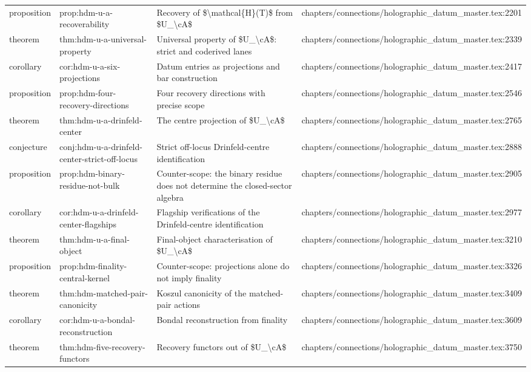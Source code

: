 \documentclass[11pt]{article}
\begin{document}
\begin{longtable}{L{0.10\textwidth}L{0.26\textwidth}L{0.42\textwidth}L{0.22\textwidth}}
proposition & prop:hdm-u-a-recoverability & Recovery of \$\textbackslash{}mathcal\{H\}(T)\$ from \$U\_\textbackslash{}cA\$ & chapters/connections/holographic\_datum\_master.tex:2201\\
theorem & thm:hdm-u-a-universal-property & Universal property of \$U\_\textbackslash{}cA\$: strict and coderived lanes & chapters/connections/holographic\_datum\_master.tex:2339\\
corollary & cor:hdm-u-a-six-projections & Datum entries as projections and bar construction & chapters/connections/holographic\_datum\_master.tex:2417\\
proposition & prop:hdm-four-recovery-directions & Four recovery directions with precise scope & chapters/connections/holographic\_datum\_master.tex:2546\\
theorem & thm:hdm-u-a-drinfeld-center & The centre projection of \$U\_\textbackslash{}cA\$ & chapters/connections/holographic\_datum\_master.tex:2765\\
conjecture & conj:hdm-u-a-drinfeld-center-strict-off-locus & Strict off-locus Drinfeld-centre identification & chapters/connections/holographic\_datum\_master.tex:2888\\
proposition & prop:hdm-binary-residue-not-bulk & Counter-scope: the binary residue does not determine the closed-sector algebra & chapters/connections/holographic\_datum\_master.tex:2905\\
corollary & cor:hdm-u-a-drinfeld-center-flagships & Flagship verifications of the Drinfeld-centre identification & chapters/connections/holographic\_datum\_master.tex:2977\\
theorem & thm:hdm-u-a-final-object & Final-object characterisation of \$U\_\textbackslash{}cA\$ & chapters/connections/holographic\_datum\_master.tex:3210\\
proposition & prop:hdm-finality-central-kernel & Counter-scope: projections alone do not imply finality & chapters/connections/holographic\_datum\_master.tex:3326\\
theorem & thm:hdm-matched-pair-canonicity & Koszul canonicity of the matched-pair actions & chapters/connections/holographic\_datum\_master.tex:3409\\
corollary & cor:hdm-u-a-bondal-reconstruction & Bondal reconstruction from finality & chapters/connections/holographic\_datum\_master.tex:3609\\
theorem & thm:hdm-five-recovery-functors & Recovery functors out of \$U\_\textbackslash{}cA\$ & chapters/connections/holographic\_datum\_master.tex:3750\\

\end{longtable}
\end{document}
